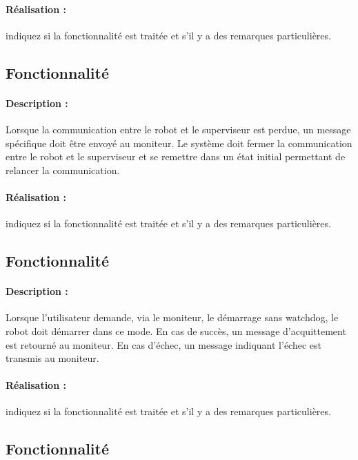 \documentclass[11pt, a4paper]{paper}
\newcounter{cptreq}
\begin{document}
\paragraph{\color{black}Réalisation :}  {\color{red} indiquez si la fonctionnalité est traitée et s'il y a des remarques particulières.}

\subsection{Fonctionnalité \thecptreq}

\paragraph{Description :} Lorsque la communication entre le robot et le superviseur est perdue, un message spécifique doit être envoyé au moniteur. Le système doit fermer la communication entre le robot et le superviseur et se remettre dans un état initial permettant de relancer la communication.

\paragraph{\color{black}Réalisation :}  {\color{red} indiquez si la fonctionnalité est traitée et s'il y a des remarques particulières.}

{\color{gray}
\subsection{Fonctionnalité \thecptreq *}

\paragraph{Description :} Lorsque l'utilisateur demande, via le moniteur, le démarrage sans watchdog, le robot doit démarrer dans ce mode. En cas de succès, un message d'acquittement est retourné au moniteur. En cas d'échec, un message indiquant l'échec est transmis au moniteur.

\paragraph{\color{black}Réalisation :}  {\color{red} indiquez si la fonctionnalité est traitée et s'il y a des remarques particulières.}
}
\subsection{Fonctionnalité \thecptreq}
\end{document}
